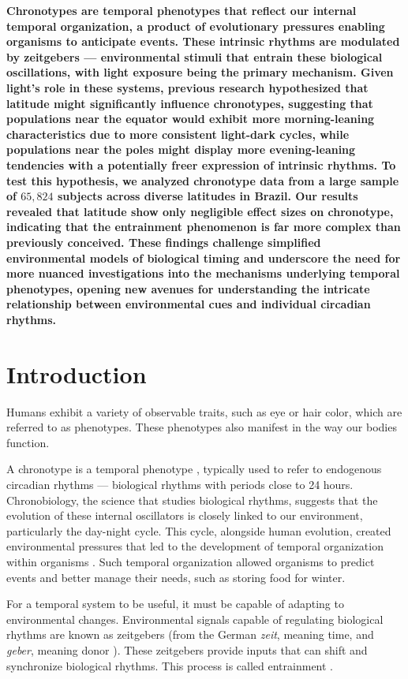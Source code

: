 \documentclass[
12pt,
openright,
oneside,
a4paper,
chapter=TITLE,
section=TITLE,
french,
spanish,
brazil,
english
]{abntex2}
\begin{document}
\noindent \textbf{Chronotypes are temporal phenotypes that reflect our
internal temporal organization, a product of evolutionary pressures
enabling organisms to anticipate events. These intrinsic rhythms are
modulated by zeitgebers --- environmental stimuli that entrain these
biological oscillations, with light exposure being the primary
mechanism. Given light's role in these systems, previous research
hypothesized that latitude might significantly influence chronotypes,
suggesting that populations near the equator would exhibit more
morning-leaning characteristics due to more consistent light-dark
cycles, while populations near the poles might display more
evening-leaning tendencies with a potentially freer expression of
intrinsic rhythms. To test this hypothesis, we analyzed chronotype data
from a large sample of \(65,824\) subjects across diverse latitudes in
Brazil. Our results revealed that latitude show only negligible effect
sizes on chronotype, indicating that the entrainment phenomenon is far
more complex than previously conceived. These findings challenge
simplified environmental models of biological timing and underscore the
need for more nuanced investigations into the mechanisms underlying
temporal phenotypes, opening new avenues for understanding the intricate
relationship between environmental cues and individual circadian
rhythms.}

\section{Introduction}\label{introduction}

Humans exhibit a variety of observable traits, such as eye or hair
color, which are referred to as phenotypes. These phenotypes also
manifest in the way our bodies function.

A chronotype is a temporal phenotype
\autocite{ehret1974,pittendrigh1993}, typically used to refer to
endogenous circadian rhythms --- biological rhythms with periods close
to 24 hours. Chronobiology, the science that studies biological rhythms,
suggests that the evolution of these internal oscillators is closely
linked to our environment, particularly the day-night cycle. This cycle,
alongside human evolution, created environmental pressures that led to
the development of temporal organization within organisms
\autocite{aschoff1989,paranjpe2005}. Such temporal organization allowed
organisms to predict events and better manage their needs, such as
storing food for winter.

For a temporal system to be useful, it must be capable of adapting to
environmental changes. Environmental signals capable of regulating
biological rhythms are known as zeitgebers (from the German \emph{zeit},
meaning time, and \emph{geber}, meaning donor
\autocite{cambridgeuniversitypress}). These zeitgebers provide inputs
that can shift and synchronize biological rhythms. This process is
called entrainment \autocite{roenneberg2003a,roenneberg2010}.
\end{document}
